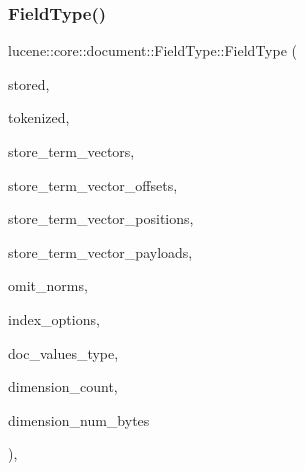 \subsubsection{\texorpdfstring{Field\+Type()}{FieldType()}}
{\footnotesize\ttfamily lucene\+::core\+::document\+::\+Field\+Type\+::\+Field\+Type (\begin{DoxyParamCaption}\item[{\mbox{\hyperlink{ZlibCrc32_8h_a2c212835823e3c54a8ab6d95c652660e}{const}} bool}]{stored,  }\item[{\mbox{\hyperlink{ZlibCrc32_8h_a2c212835823e3c54a8ab6d95c652660e}{const}} bool}]{tokenized,  }\item[{\mbox{\hyperlink{ZlibCrc32_8h_a2c212835823e3c54a8ab6d95c652660e}{const}} bool}]{store\+\_\+term\+\_\+vectors,  }\item[{\mbox{\hyperlink{ZlibCrc32_8h_a2c212835823e3c54a8ab6d95c652660e}{const}} bool}]{store\+\_\+term\+\_\+vector\+\_\+offsets,  }\item[{\mbox{\hyperlink{ZlibCrc32_8h_a2c212835823e3c54a8ab6d95c652660e}{const}} bool}]{store\+\_\+term\+\_\+vector\+\_\+positions,  }\item[{\mbox{\hyperlink{ZlibCrc32_8h_a2c212835823e3c54a8ab6d95c652660e}{const}} bool}]{store\+\_\+term\+\_\+vector\+\_\+payloads,  }\item[{\mbox{\hyperlink{ZlibCrc32_8h_a2c212835823e3c54a8ab6d95c652660e}{const}} bool}]{omit\+\_\+norms,  }\item[{\mbox{\hyperlink{ZlibCrc32_8h_a2c212835823e3c54a8ab6d95c652660e}{const}} \mbox{\hyperlink{namespacelucene_1_1core_1_1index_a0d5e1f98471a76de106056cf3b5a7897}{lucene\+::core\+::index\+::\+Index\+Options}}}]{index\+\_\+options,  }\item[{\mbox{\hyperlink{ZlibCrc32_8h_a2c212835823e3c54a8ab6d95c652660e}{const}} \mbox{\hyperlink{namespacelucene_1_1core_1_1index_a2f7ffaef6429b5df542c8aa12f8b9883}{lucene\+::core\+::index\+::\+Doc\+Values\+Type}}}]{doc\+\_\+values\+\_\+type,  }\item[{\mbox{\hyperlink{ZlibCrc32_8h_a2c212835823e3c54a8ab6d95c652660e}{const}} uint32\+\_\+t}]{dimension\+\_\+count,  }\item[{\mbox{\hyperlink{ZlibCrc32_8h_a2c212835823e3c54a8ab6d95c652660e}{const}} uint32\+\_\+t}]{dimension\+\_\+num\+\_\+bytes }\end{DoxyParamCaption})\hspace{0.3cm}{\ttfamily [inline]}, {\ttfamily [private]}}



